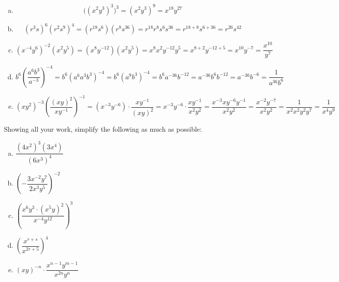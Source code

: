 \documentclass[11pt,letterpaper]{article}
\begin{document}
\sol 
\begin{enumerate}[(a)]
\item 
	\[
	\big( (x^2 y^3)^3 \big)^3= (x^2 y^3)^9= x^{18} y^{27}
	\] \pspace

\item 
	\[
	(r^3s)^6 (r^2s^9)^4= (r^{18} s^6) (r^8 s^{36})= r^{18} r^8 s^6 s^{36}= r^{18+8} s^{6+36}= r^{26} s^{42}
	\] \pspace

\item 
	\[
	(x^{-4} y^6)^{-2} (x^2 y^5)= (x^8 y^{-12}) (x^2 y^5)= x^8 x^2 y^{-12} y^5= x^{8+2} y^{-12+5}= x^{10} y^{-7}= \dfrac{x^{10}}{y^7}
	\] \pspace

\item 
	\[
	b^6 \left( \dfrac{a^6 b^3}{a^{-3}} \right)^{-4}= b^6 \left( a^6 a^3 b^3 \right)^{-4}= b^6 (a^9 b^3)^{-4}= b^6 a^{-36} b^{-12}= a^{-36} b^6 b^{-12}= a^{-36} b^{-6}= \dfrac{1}{a^{36} b^6}
	\] \pspace

\item 
	\[
	(xy^2)^{-3} \left( \dfrac{(xy)^2}{xy^{-1}} \right)^{-1}= (x^{-3} y^{-6}) \cdot \dfrac{xy^{-1}}{(xy)^2}= x^{-3} y^{-6} \cdot \dfrac{x y^{-1}}{x^2 y^2}= \dfrac{x^{-3} x y^{-6} y^{-1}}{x^2 y^2}= \dfrac{x^{-2} y^{-7}}{x^2 y^2}= \dfrac{1}{x^2 x^2 y^2 y^7}= \dfrac{1}{x^4 y^9}
	\]
\end{enumerate}



\newpage



 Showing all your work, simplify the following as much as possible:
	\begin{enumerate}[(a)]
	\item $\dfrac{(4x^2)^3 (3x^4)}{(6x^3)^4}$
	\item $\left( - \dfrac{3x^{-2} y^7}{2x^3 y^5} \right)^{-2}$
	\item $\left( \dfrac{x^6 y^3 \cdot (x^5y)^2}{x^{-4} y^{12}} \right)^3$
	\item $\left( \dfrac{x^{r + s}}{x^{2r + 5}} \right)^4$
	\item $(xy)^{-n} \cdot \dfrac{x^{n - 1} y^{m - 1}}{x^{2n} y^n}$
	\end{enumerate} \pspace
\end{document}
